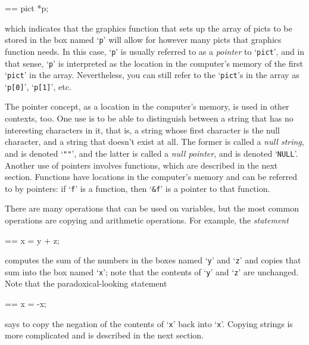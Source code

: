 \documentclass{book}
\makeatletter
\newenvironment{Texinfopreformatted}{%
  \par\GNUTobeylines\obeyspaces\frenchspacing\parskip=\z@\parindent=\z@}{}
{\catcode`\^^M=13 \gdef\GNUTobeylines{\catcode`\^^M=13 \def^^M{\null\par}}}
\newenvironment{Texinfoindented}{\begin{list}{}{}\item\relax}{\end{list}}
\renewcommand{\_}{\Texinfounderscore\discretionary{}{}{}}
\makeatother
\begin{document}
\begin{Texinfoindented}
\begin{Texinfopreformatted}%
\ttfamily pict *p;
\end{Texinfopreformatted}
\end{Texinfoindented}
\noindent{}which indicates that the graphics function that sets up the
array of picts to be stored in
the box named `\texttt{p}' will allow for however
many picts that graphics function needs.
In this case, `\texttt{p}' is usually referred to as a \textsl{pointer}
%
to `\texttt{pict}', and in that sense, `\texttt{p}'
is interpreted as the location in the computer's memory
of the first `\texttt{pict}' in the array.
Nevertheless, you can still refer to the `\texttt{pict}'s in the
array as `\texttt{p[0]}', `\texttt{p[1]}', etc.

The pointer
%
concept, as a location in the computer's memory,
is used in other contexts, too.
One use is to be able to distinguish between
a string that has no interesting characters in it, that is,
a string whose first character is the null character, and
a string that doesn't exist at all.
The former is called a \textsl{null string},
%
%
and is denoted `\texttt{""}',
and the latter is called a \textsl{null pointer}, and is
denoted `\texttt{NULL}'.
%
Another use of pointers
involves functions, which are described in the next section.
Functions have locations in the computer's memory and can be referred to by
pointers: if `\texttt{f}' is a function, then `\texttt{\&f}' is a pointer
to that function.

There are many operations that can be used on variables, but the most common
operations are copying and arithmetic operations.  For example, the
\textsl{statement}

\begin{Texinfoindented}
\begin{Texinfopreformatted}%
\ttfamily x = y + z;
\end{Texinfopreformatted}
\end{Texinfoindented}
\noindent{}computes the sum of the numbers in the boxes named `\texttt{y}' and `\texttt{z}'
and copies that sum into the box named `\texttt{x}'; note that the contents
of `\texttt{y}' and `\texttt{z}' are unchanged.  Note that the paradoxical-looking
statement

\begin{Texinfoindented}
\begin{Texinfopreformatted}%
\ttfamily x = -x;
\end{Texinfopreformatted}
\end{Texinfoindented}
\noindent{}says to copy the negation of the contents of `\texttt{x}' back into `\texttt{x}'.
Copying strings is more complicated and is described in the
next section.
\end{document}

